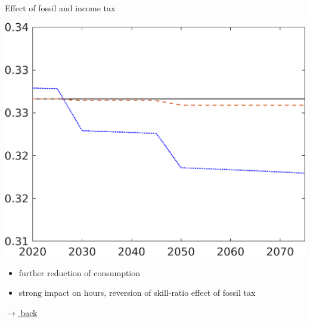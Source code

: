 \documentclass[11pt,aspectratio=169]{beamer}
\begin{document}
\begin{frame}{Effect of fossil and income tax}
\begin{minipage}[]{0.3\textwidth}
	\end{minipage}
	\begin{minipage}[]{0.3\textwidth}
		\includegraphics[width=1\textwidth]{../codding_model/own_basedOnFried/optimalPol_elastS_DisuSci/figures/all_1705/CompCounterFac_withLF_taufopt1_taulopt0_hl_spillover0_noskill0_sep1_BN0_ineq0_red0_xgrowth0_etaa0.79_lgd0.png}
	\end{minipage}
	
	\vspace{3mm}
	\begin{itemize}
		\item further reduction of consumption 
		\item strong impact on hours, reversion of skill-ratio effect of fossil tax
		\end{itemize}
	
	
	\vspace{-1mm}
	\hfill
	\hyperlink{effalloback}{\tiny{$\rightarrow$ back}} 
\end{frame}
\end{document}
